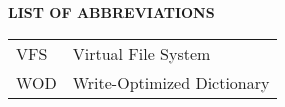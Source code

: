{}

\begin{center}
\textbf{LIST OF ABBREVIATIONS}
\vspace{16pt}
\end{center}


\noindent
\begin{tabular}{p{0.8in} p{5in}}
VFS     & Virtual File System\\
WOD     & Write-Optimized Dictionary\\
\end{tabular}

\clearpage
